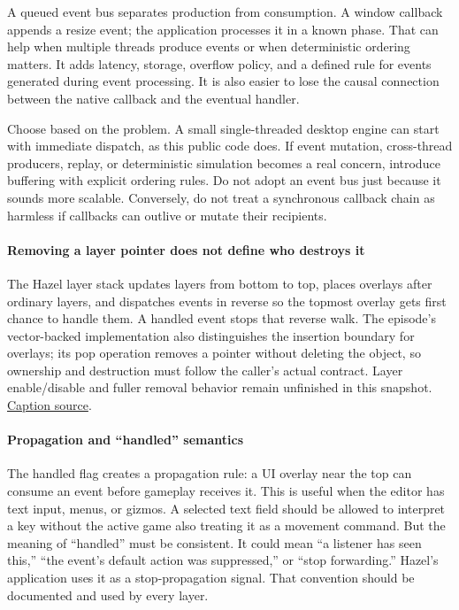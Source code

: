 A queued event bus separates production from consumption. A window callback appends a resize event; the application processes it in a known phase. That can help when multiple threads produce events or when deterministic ordering matters. It adds latency, storage, overflow policy, and a defined rule for events generated during event processing. It is also easier to lose the causal connection between the native callback and the eventual handler.

Choose based on the problem. A small single-threaded desktop engine can start with immediate dispatch, as this public code does. If event mutation, cross-thread producers, replay, or deterministic simulation becomes a real concern, introduce buffering with explicit ordering rules. Do not adopt an event bus just because it sounds more scalable. Conversely, do not treat a synchronous callback chain as harmless if callbacks can outlive or mutate their recipients.

\paragraph{Removing a layer pointer does not define who destroys it}\label{removing-a-layer-pointer-does-not-define-who-destroys-it}

The Hazel layer stack updates layers from bottom to top, places overlays after ordinary layers, and dispatches events in reverse so the topmost overlay gets first chance to handle them. A handled event stops that reverse walk. The episode's vector-backed implementation also distinguishes the insertion boundary for overlays; its pop operation removes a pointer without deleting the object, so ownership and destruction must follow the caller's actual contract. Layer enable/disable and fuller removal behavior remain unfinished in this snapshot. \href{https://www.youtube.com/watch?v=_Kj6BSfM6P4}{Caption source}.

\paragraph{Propagation and ``handled'' semantics}\label{propagation-and-handled-semantics}

The handled flag creates a propagation rule: a UI overlay near the top can consume an event before gameplay receives it. This is useful when the editor has text input, menus, or gizmos. A selected text field should be allowed to interpret a key without the active game also treating it as a movement command. But the meaning of ``handled'' must be consistent. It could mean ``a listener has seen this,'' ``the event's default action was suppressed,'' or ``stop forwarding.'' Hazel's application uses it as a stop-propagation signal. That convention should be documented and used by every layer.

